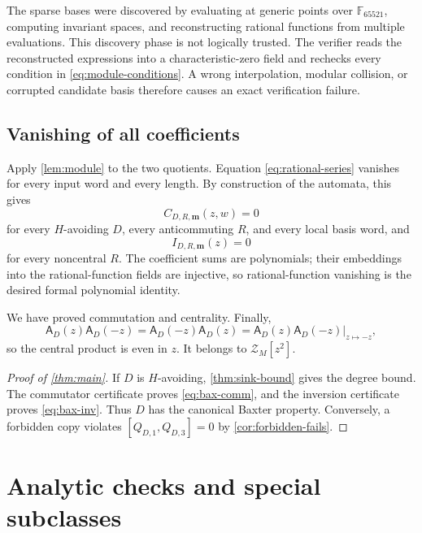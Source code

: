 \documentclass[10pt,letterpaper]{article}
\newcommand{\Zalg}{\mathcal Z}
\newcommand{\cA}{\mathsf A}
\begin{document}
The sparse bases were discovered by evaluating at generic points over \(\mathbb F_{65521}\), computing invariant spaces, and reconstructing rational functions from multiple evaluations.  This discovery phase is not logically trusted.  The verifier reads the reconstructed expressions into a characteristic-zero field and rechecks every condition in \eqref{eq:module-conditions}.  A wrong interpolation, modular collision, or corrupted candidate basis therefore causes an exact verification failure.

\subsection{Vanishing of all coefficients}

Apply \cref{lem:module} to the two quotients.  Equation \eqref{eq:rational-series} vanishes for every input word and every length.  By construction of the automata, this gives
\begin{equation}\label{eq:comm-proved}
 C_{D,R,\bm m}(z,w)=0
\end{equation}
for every \(H\)-avoiding \(D\), every anticommuting \(R\), and every local basis word, and
\begin{equation}\label{eq:inv-proved}
 I_{D,R,\bm m}(z)=0
\end{equation}
for every noncentral \(R\).  The coefficient sums are polynomials; their embeddings into the rational-function fields are injective, so rational-function vanishing is the desired formal polynomial identity.

We have proved commutation and centrality.  Finally,
\[
 \cA_D(z)\cA_D(-z)
 =\cA_D(-z)\cA_D(z)
 =\left.\cA_D(z)\cA_D(-z)\right|_{z\mapsto-z},
\]
so the central product is even in \(z\).  It belongs to \(\Zalg_M[z^2]\).

\begin{proof}[Proof of \cref{thm:main}]
If \(D\) is \(H\)-avoiding, \cref{thm:sink-bound} gives the degree bound.  The commutator certificate proves \eqref{eq:bax-comm}, and the inversion certificate proves \eqref{eq:bax-inv}.  Thus \(D\) has the canonical Baxter property.  Conversely, a forbidden copy violates \([Q_{D,1},Q_{D,3}]=0\) by \cref{cor:forbidden-fails}.
\end{proof}

\section{Analytic checks and special subclasses}\label{sec:checks}
\end{document}
